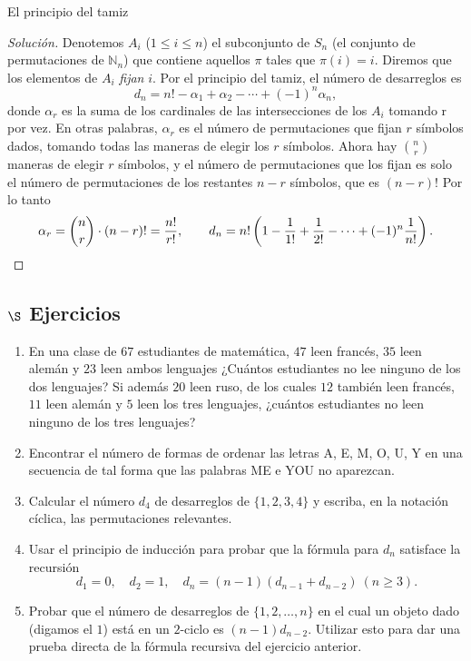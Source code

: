 \begin{section}{El principio del tamiz}
\begin{proof}[Solución]
Denotemos $A_i$ ($1 \le i \le n$) el subconjunto de $S_n$ (el conjunto de permutaciones de $\mathbb N_n$) que contiene aquellos $\pi$ tales que $\pi(i)=i$. Diremos que los elementos de $A_i$ \textit{fijan} $i$. Por el principio del tamiz, el número de desarreglos es 
$$
d_n= n! -\alpha_1+\alpha_2 - \cdots +(-1)^n\alpha_n,
$$
donde $\alpha_r$ es la suma de los cardinales de las intersecciones de los $A_i$ tomando r por vez. En otras palabras, $\alpha_r$ es el número de permutaciones que fijan $r$ símbolos dados, tomando todas las maneras de elegir los $r$ símbolos. Ahora hay $\binom{n}{r} $ maneras de elegir $r$ símbolos, y el número de  permutaciones que los fijan es solo el número de permutaciones de los restantes $n-r$ símbolos, que es $(n-r)!$  Por lo tanto
$$
\alpha_r = \binom{n}{r} \cdot (n-r)! = \frac{n!}{r!},\qquad d_n=
n!\left(1-\frac{1}{1!} + \frac{1}{2!}-\cdots
+(-1)^n\frac{1}{n!}\right). \nopagebreak$$
\end{proof}

\subsection*{$\S$ Ejercicios}
\begin{enumerate}
\item En una clase de $67$ estudiantes de matemática, $47$ leen francés, $35$ leen alemán y $23$ leen ambos lenguajes ¿Cuántos estudiantes no lee ninguno de los dos lenguajes? Si además $20$ leen ruso, de los
cuales $12$ también leen francés, $11$ leen alemán y $5$ leen los tres lenguajes, ¿cuántos estudiantes no leen ninguno de los tres lenguajes?

\item Encontrar el número de formas de ordenar las letras A, E, M, O, U, Y en una secuencia de tal forma que las palabras ME e YOU no aparezcan. 

\item
Calcular el número $d_4$ de desarreglos de $\{1,2,3,4\}$ y escriba, en la notación cíclica, las permutaciones relevantes.

\item Usar el principio de inducción para probar que la fórmula para $d_n$ satisface la recursión
$$
d_1=0, \quad d_2=1,\quad d_n= (n-1)(d_{n-1}+d_{n-2}) \ (n\ge 3).
$$

\item Probar que el número de desarreglos de $\{1,2,\ldots,n\}$ en el cual un objeto dado (digamos el $1$) está en un $2$-ciclo es $(n-1)d_{n-2}$. Utilizar esto para dar una prueba directa de la fórmula recursiva del ejercicio anterior.
\end{enumerate}

\end{section}


